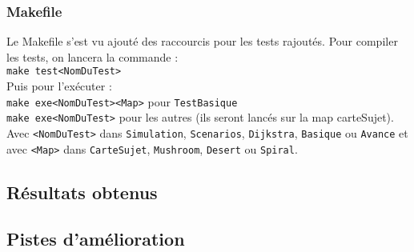 \documentclass[a4paper,8pt]{article} %
\begin{document}
\subsubsection{Makefile}
Le Makefile s'est vu ajouté des raccourcis pour les tests rajoutés.
Pour compiler les tests, on lancera la commande : \\
\texttt{make test<NomDuTest>}\\
Puis pour l'exécuter : \\
\texttt{make exe<NomDuTest><Map>} pour \texttt{TestBasique}\\
\texttt{make exe<NomDuTest>} pour les autres (ils seront lancés sur la map carteSujet).\\

Avec \texttt{<NomDuTest>} dans \texttt{Simulation}, \texttt{Scenarios}, \texttt{Dijkstra}, \texttt{Basique} ou \texttt{Avance} et avec 
\texttt{<Map>} dans \texttt{CarteSujet}, \texttt{Mushroom}, \texttt{Desert} ou \texttt{Spiral}.

\subsection{Résultats obtenus}
\subsection{Pistes d'amélioration}
\end{document}
